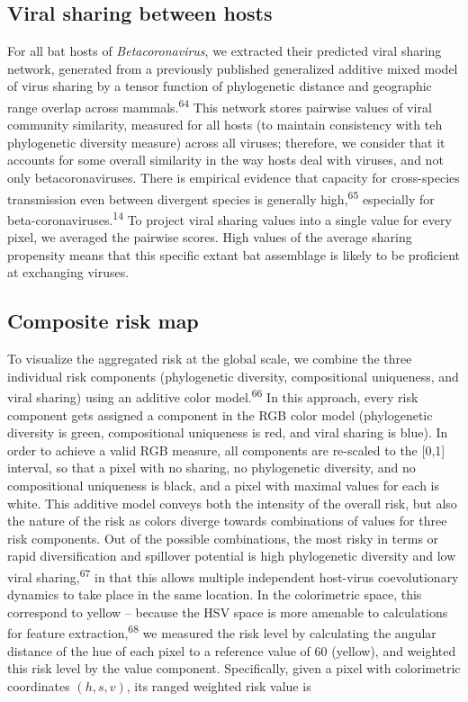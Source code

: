 \documentclass[10pt,oneside]{article}
\begin{document}
\hypertarget{viral-sharing-between-hosts}{%
\subsection{Viral sharing between
hosts}\label{viral-sharing-between-hosts}}

For all bat hosts of \emph{Betacoronavirus}, we extracted their
predicted viral sharing network, generated from a previously published
generalized additive mixed model of virus sharing by a tensor function
of phylogenetic distance and geographic range overlap across
mammals.\textsuperscript{64} This network stores pairwise values of
viral community similarity, measured for all hosts (to maintain
consistency with teh phylogenetic diversity measure) across all viruses;
therefore, we consider that it accounts for some overall similarity in
the way hosts deal with viruses, and not only betacoronaviruses. There
is empirical evidence that capacity for cross-species transmission even
between divergent species is generally high,\textsuperscript{65}
especially for beta-coronaviruses.\textsuperscript{14} To project viral
sharing values into a single value for every pixel, we averaged the
pairwise scores. High values of the average sharing propensity means
that this specific extant bat assemblage is likely to be proficient at
exchanging viruses.

\hypertarget{composite-risk-map}{%
\subsection{Composite risk map}\label{composite-risk-map}}

To visualize the aggregated risk at the global scale, we combine the
three individual risk components (phylogenetic diversity, compositional
uniqueness, and viral sharing) using an additive color
model.\textsuperscript{66} In this approach, every risk component gets
assigned a component in the RGB color model (phylogenetic diversity is
green, compositional uniqueness is red, and viral sharing is blue). In
order to achieve a valid RGB measure, all components are re-scaled to
the {[}0,1{]} interval, so that a pixel with no sharing, no phylogenetic
diversity, and no compositional uniqueness is black, and a pixel with
maximal values for each is white. This additive model conveys both the
intensity of the overall risk, but also the nature of the risk as colors
diverge towards combinations of values for three risk components. Out of
the possible combinations, the most risky in terms or rapid
diversification and spillover potential is high phylogenetic diversity
and low viral sharing,\textsuperscript{67} in that this allows multiple
independent host-virus coevolutionary dynamics to take place in the same
location. In the colorimetric space, this correspond to yellow --
because the HSV space is more amenable to calculations for feature
extraction,\textsuperscript{68} we measured the risk level by
calculating the angular distance of the hue of each pixel to a reference
value of 60 (yellow), and weighted this risk level by the value
component. Specifically, given a pixel with colorimetric coordinates
\((h,s,v)\), its ranged weighted risk value is
\end{document}
